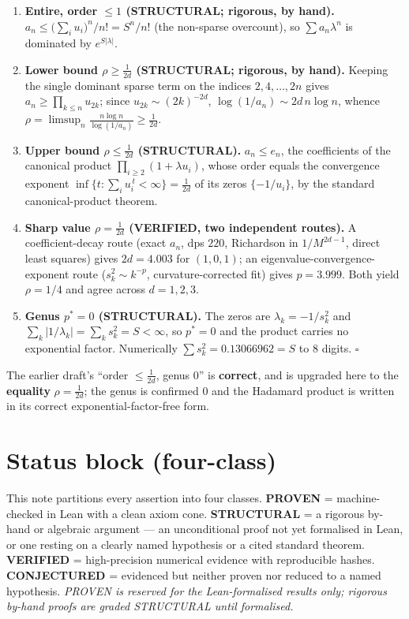 \documentclass[
]{article}
\theoremstyle{plain}
\theoremstyle{remark}
\begin{document}
\begin{enumerate}
\def\labelenumi{\arabic{enumi}.}
\item
  \textbf{Entire, order \(\le1\) (STRUCTURAL; rigorous, by hand).}
  \(a_n\le \bigl(\sum_i u_i\bigr)^n/n! = S^n/n!\) (the non-sparse
  overcount), so \(\sum a_n\lambda^n\) is dominated by
  \(e^{S|\lambda|}\).
\item
  \textbf{Lower bound \(\rho\ge\tfrac1{2d}\) (STRUCTURAL; rigorous, by
  hand).} Keeping the single dominant sparse term on the indices
  \(2,4,\dots,2n\) gives \(a_n\ge \prod_{k\le n}u_{2k}\); since
  \(u_{2k}\sim(2k)^{-2d}\), \(\log(1/a_n)\sim 2d\,n\log n\), whence
  \(\rho=\limsup_n \frac{n\log n}{\log(1/a_n)}\ge\frac1{2d}\).
\item
  \textbf{Upper bound \(\rho\le\tfrac1{2d}\) (STRUCTURAL).}
  \(a_n\le e_n\), the coefficients of the canonical product
  \(\prod_{i\ge2}(1+\lambda u_i)\), whose order equals the convergence
  exponent \(\inf\{t:\sum_i u_i^{\,t}<\infty\}=\tfrac1{2d}\) of its
  zeros \(\{-1/u_i\}\), by the standard canonical-product theorem.
\item
  \textbf{Sharp value \(\rho=\tfrac1{2d}\) (VERIFIED, two independent
  routes).} A coefficient-decay route (exact \(a_n\), dps \(220\),
  Richardson in \(1/M^{2d-1}\), direct least squares) gives \(2d=4.003\)
  for \((1,0,1)\); an eigenvalue-convergence-exponent route
  (\(s_k^2\sim k^{-p}\), curvature-corrected fit) gives \(p=3.999\).
  Both yield \(\rho=1/4\) and agree across \(d=1,2,3\).
\item
  \textbf{Genus \(p^{*}=0\) (STRUCTURAL).} The zeros are
  \(\lambda_k=-1/s_k^2\) and
  \(\sum_k|1/\lambda_k|=\sum_k s_k^2=S<\infty\), so \(p^{*}=0\) and the
  product carries no exponential factor. Numerically
  \(\sum s_k^2=0.13066962=S\) to \(8\) digits. \(\square\)
\end{enumerate}

The earlier draft's ``order \(\le \tfrac1{2d}\), genus \(0\)'' is
\textbf{correct}, and is upgraded here to the \textbf{equality}
\(\rho=\tfrac1{2d}\); the genus is confirmed \(0\) and the Hadamard
product is written in its correct exponential-factor-free form.

\section{Status block (four-class)}\label{status-block-four-class}

This note partitions every assertion into four classes. \textbf{PROVEN}
= machine-checked in Lean with a clean axiom cone. \textbf{STRUCTURAL} =
a rigorous by-hand or algebraic argument --- an unconditional proof not
yet formalised in Lean, or one resting on a clearly named hypothesis or
a cited standard theorem. \textbf{VERIFIED} = high-precision numerical
evidence with reproducible hashes. \textbf{CONJECTURED} = evidenced but
neither proven nor reduced to a named hypothesis. \emph{PROVEN is
reserved for the Lean-formalised results only; rigorous by-hand proofs
are graded STRUCTURAL until formalised.}
\end{document}
